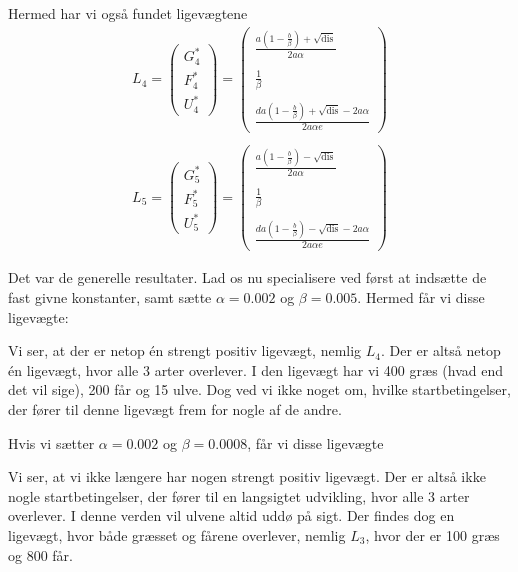 \documentclass[12pt]{article}
\begin{document}
Hermed har vi også fundet ligevægtene
\begin{align}
L_4 = \begin{pmatrix}
G_4^* \\ F^*_4 \\ U_4^*
\end{pmatrix} = \begin{pmatrix}
\frac{a \left( 1 - \frac{b}{\beta} \right)  + \sqrt{\text{dis}}}{2a\alpha}  \\ \\
\frac{1}{\beta} \\ \\
\frac{d a \left( 1 - \frac{b}{\beta} \right)  + \sqrt{\text{dis}} - 2a\alpha}{2a\alpha e}
\end{pmatrix}
\\
\\ 
L_5 = \begin{pmatrix}
G_5^* \\ F^*_5 \\ U_5^*
\end{pmatrix} = \begin{pmatrix}
\frac{a \left( 1 - \frac{b}{\beta} \right)  - \sqrt{\text{dis}}}{2a\alpha}  \\ \\
\frac{1}{\beta} \\ \\
\frac{d a \left( 1 - \frac{b}{\beta} \right)  - \sqrt{\text{dis}} - 2a\alpha}{2a\alpha e} 
\end{pmatrix}
\end{align}

Det var de generelle resultater. Lad os nu specialisere ved først at indsætte de fast givne  konstanter, samt sætte $\alpha=0.002$ og $\beta=0.005$. Hermed får vi disse ligevægte:
\begin{center}

\end{center}
Vi ser, at der er netop én strengt positiv ligevægt, nemlig $L_4$. Der er altså netop én ligevægt, hvor alle 3 arter overlever. I den ligevægt har vi 400 græs (hvad end det vil sige), 200 får og 15 ulve. Dog ved vi ikke noget om, hvilke startbetingelser, der fører til denne ligevægt frem for nogle af de andre.

Hvis vi sætter $\alpha=0.002$ og $\beta=0.0008$, får vi disse ligevægte
\begin{center}

\end{center}
Vi ser, at vi ikke længere har nogen strengt positiv ligevægt. Der er altså ikke nogle startbetingelser, der fører til en langsigtet udvikling, hvor alle 3 arter overlever. I denne verden vil ulvene altid uddø på sigt. Der findes dog en ligevægt, hvor både græsset og fårene overlever, nemlig $L_3$, hvor der er 100 græs og 800 får.
\end{document}

